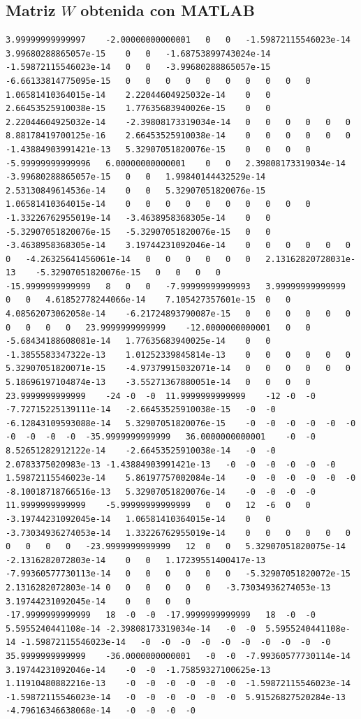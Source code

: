 \documentclass[12pt]{report} %
\begin{document}
\begin{landscape}
\subsection*{Matriz $W$ obtenida con MATLAB}
\begin{lstlisting}[numbers=none, basicstyle=\ttfamily\tiny, captionpos=b, caption={Matriz de coeficientes $W = G^{-1}$ ($54\times54$) calculada con MATLAB, sin redondear.}, label=cod:W-matlab]
3.99999999999997	-2.00000000000001	0	0	-1.59872115546023e-14	3.99680288865057e-15	0	0	-1.68753899743024e-14	-1.59872115546023e-14	0	0	-3.99680288865057e-15	-6.66133814775095e-15	0	0	0	0	0	0	0	0	0	0	1.06581410364015e-14	2.22044604925032e-14	0	0	2.66453525910038e-15	1.77635683940026e-15	0	0	2.22044604925032e-14	-2.39808173319034e-14	0	0	0	0	0	0	8.88178419700125e-16	2.66453525910038e-14	0	0	0	0	0	0	-1.43884903991421e-13	5.32907051820076e-15	0	0	0	0
-5.99999999999996	6.00000000000001	0	0	2.39808173319034e-14	-3.99680288865057e-15	0	0	1.99840144432529e-14	2.53130849614536e-14	0	0	5.32907051820076e-15	1.06581410364015e-14	0	0	0	0	0	0	0	0	0	0	-1.33226762955019e-14	-3.4638958368305e-14	0	0	-5.32907051820076e-15	-5.32907051820076e-15	0	0	-3.4638958368305e-14	3.19744231092046e-14	0	0	0	0	0	0	0	-4.26325641456061e-14	0	0	0	0	0	0	2.13162820728031e-13	-5.32907051820076e-15	0	0	0	0
-15.9999999999999	8	0	0	-7.99999999999993	3.99999999999999	0	0	4.61852778244066e-14	7.105427357601e-15	0	0	4.08562073062058e-14	-6.21724893790087e-15	0	0	0	0	0	0	0	0	0	0	23.9999999999999	-12.0000000000001	0	0	-5.68434188608081e-14	1.77635683940025e-14	0	0	-1.3855583347322e-13	1.01252339845814e-13	0	0	0	0	0	0	5.32907051820071e-15	-4.97379915032071e-14	0	0	0	0	0	0	5.18696197104874e-13	-3.55271367880051e-14	0	0	0	0
23.9999999999999	-24	-0	-0	11.9999999999999	-12	-0	-0	-7.72715225139111e-14	-2.66453525910038e-15	-0	-0	-6.12843109593088e-14	5.32907051820076e-15	-0	-0	-0	-0	-0	-0	-0	-0	-0	-0	-35.9999999999999	36.0000000000001	-0	-0	8.52651282912122e-14	-2.66453525910038e-14	-0	-0	2.0783375020983e-13	-1.43884903991421e-13	-0	-0	-0	-0	-0	-0	1.59872115546023e-14	5.86197757002084e-14	-0	-0	-0	-0	-0	-0	-8.10018718766516e-13	5.32907051820076e-14	-0	-0	-0	-0
11.9999999999999	-5.99999999999999	0	0	12	-6	0	0	-3.19744231092045e-14	1.06581410364015e-14	0	0	-3.73034936274053e-14	1.33226762955019e-14	0	0	0	0	0	0	0	0	0	0	-23.9999999999999	12	0	0	5.32907051820075e-14	-2.1316282072803e-14	0	0	1.17239551400417e-13	-7.99360577730113e-14	0	0	0	0	0	0	-5.32907051820072e-15	2.1316282072803e-14	0	0	0	0	0	0	-3.73034936274053e-13	3.19744231092045e-14	0	0	0	0
-17.9999999999999	18	-0	-0	-17.9999999999999	18	-0	-0	5.5955240441108e-14	-2.39808173319034e-14	-0	-0	5.5955240441108e-14	-1.59872115546023e-14	-0	-0	-0	-0	-0	-0	-0	-0	-0	-0	35.9999999999999	-36.0000000000001	-0	-0	-7.99360577730114e-14	3.19744231092046e-14	-0	-0	-1.75859327100625e-13	1.11910480882216e-13	-0	-0	-0	-0	-0	-0	-1.59872115546023e-14	-1.59872115546023e-14	-0	-0	-0	-0	-0	-0	5.91526827520284e-13	-4.79616346638068e-14	-0	-0	-0	-0

\end{lstlisting}
\end{landscape}
\end{document}

